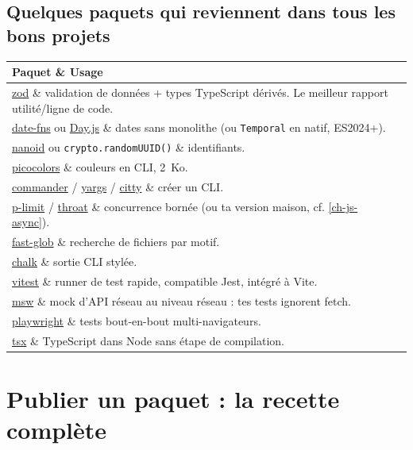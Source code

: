 \documentclass[12pt,a4paper,twoside,openright]{book}
\makeatletter
\newcommand{\link}[2]{\href{#2}{#1}}
\newenvironment{tabz}[1]{\rowcolors{2}{white}{tralight}%
  \small\setlength{\tabcolsep}{5pt}\setlength{\LTpre}{3pt}\setlength{\LTpost}{3pt}%
  \begin{longtable}{@{}#1@{}}\toprule}
  {\bottomrule\end{longtable}\normalfont\setlength{\tabcolsep}{6pt}}
\newcommand{\thd}[1]{\textbf{\color{white}#1}}
\newcommand{\headrow}{\rowcolor{theadbg}}
\makeatother
\begin{document}
\subsection{Quelques paquets qui reviennent dans tous les bons projets}

\begin{tabz}{lX}
  \headrow \thd{Paquet} \& \thd{Usage} \\
  \midrule
  \link{zod}{https://zod.dev/} \& validation de donn\'ees + types TypeScript d\'eriv\'es. Le meilleur rapport utilit\'e/ligne de code. \\
  \link{date-fns}{https://date-fns.org/} ou \link{Day.js}{https://day.js.org/} \& dates sans monolithe (ou \verb|Temporal| en natif, ES2024+). \\
  \link{nanoid}{https://github.com/ai/nanoid} ou \verb|crypto.randomUUID()| \& identifiants. \\
  \link{picocolors}{https://github.com/alexeyraspopov/picocolors} \& couleurs en CLI, 2~Ko. \\
  \link{commander}{https://github.com/tj/commander.js} / \link{yargs}{https://yargs.js.org/} / \link{citty}{https://github.com/unjs/citty} \& cr\'eer un CLI. \\
  \link{p-limit}{https://github.com/sindresorhus/p-limit} / \link{throat}{https://github.com/ForbesLindesay/throat} \& concurrence born\'ee (ou ta version maison, cf. \cref{ch-js-async}). \\
  \link{fast-glob}{https://github.com/mrmlnc/fast-glob} \& recherche de fichiers par motif. \\
  \link{chalk}{https://github.com/chalk/chalk} \& sortie CLI styl\'ee. \\
  \link{vitest}{https://vitest.dev/} \& runner de test rapide, compatible Jest, int\'egr\'e \`a Vite. \\
  \link{msw}{https://mswjs.io/} \& mock d'API r\'eseau au niveau r\'eseau : tes tests ignorent fetch. \\
  \link{playwright}{https://playwright.dev/} \& tests bout-en-bout multi-navigateurs. \\
  \link{tsx}{https://github.com/privatenumber/tsx} \& TypeScript dans Node sans \'etape de compilation. \\
\end{tabz}

\section{Publier un paquet : la recette compl\`ete}
\end{document}
